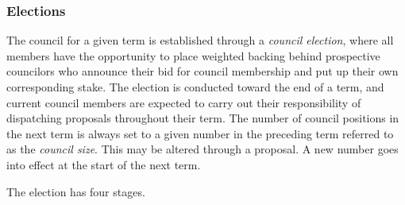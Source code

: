 \documentclass{article}
\begin{document}
\subsubsection{Elections}

The council for a given term is established through a \textit{council election}, where all members have the opportunity to place weighted backing behind prospective councilors who announce their bid for council membership and put up their own corresponding stake. The election is conducted toward the end of a term, and current council members are expected to carry out their responsibility of dispatching proposals throughout their term. The number of council positions in the next term is always set to a given number in the preceding term referred to as the \textit{council size}. This may be altered through a proposal. A new number goes into effect at the start of the next term.

The election has four stages.
\end{document}
